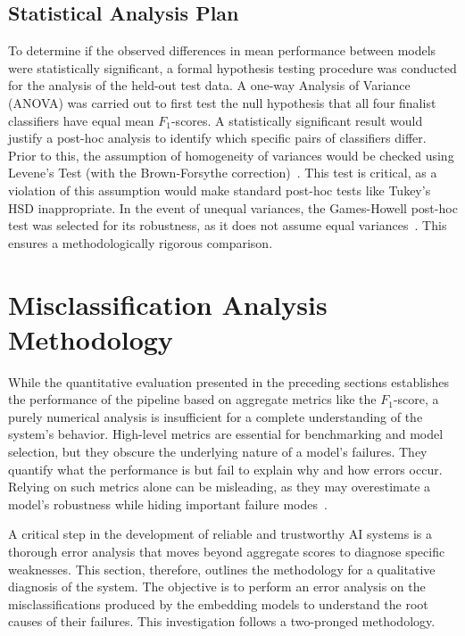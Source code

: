 \subsection{Statistical Analysis Plan}\label{ch:3.4.3}
To determine if the observed differences in mean performance between models were statistically significant, a formal hypothesis testing procedure was conducted for the analysis of the held-out test data.
A one-way Analysis of Variance (ANOVA) was carried out to first test the null hypothesis that all four finalist classifiers have equal mean \(F_1\)-scores. A statistically significant result would justify a post-hoc analysis to identify which specific pairs of classifiers differ. Prior to this, the assumption of homogeneity of variances would be checked using Levene's Test (with the Brown-Forsythe correction)~\cite{Brown01061974}. This test is critical, as a violation of this assumption would make standard post-hoc tests like Tukey's HSD inappropriate. In the event of unequal variances, the Games-Howell post-hoc test was selected for its robustness, as it does not assume equal variances~\cite{gameshowell1976}. This ensures a methodologically rigorous comparison.

\section{Misclassification Analysis Methodology}\label{ch:3.5}
While the quantitative evaluation presented in the preceding sections establishes the performance of the pipeline based on aggregate metrics like the \(F_1\)-score, a purely numerical analysis is insufficient for a complete understanding of the system's behavior. High-level metrics are essential for benchmarking and model selection, but they obscure the underlying nature of a model's failures. They quantify what the performance is but fail to explain why and how errors occur. Relying on such metrics alone can be misleading, as they may overestimate a model's robustness while hiding important failure modes~\cite{gauthier2022}.

A critical step in the development of reliable and trustworthy AI systems is a thorough error analysis that moves beyond aggregate scores to diagnose specific weaknesses. This section, therefore, outlines the methodology for a qualitative diagnosis of the system. The objective is to perform an error analysis on the misclassifications produced by the embedding models to understand the root causes of their failures. This investigation follows a two-pronged methodology.


